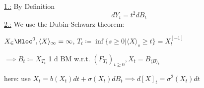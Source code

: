 \underline{1.:}
By Definition
\[dY_t = t^2 dB_t\]
\underline{2.:}
We use the Dubin-Schwarz theorem:

$X_\in\Mloc^0,\langle X\rangle_\infty=\infty$, $T_t\coloneqq \inf\{s\geq 0|\langle X\rangle_s\geq t\}=X_t^{[-1]}$

$\implies B_t\coloneqq X_{T_t}$ 1 d BM w.r.t. $(F_{T_t})_{t\geq 0}, X_t=B_{\langle B\rangle_t}$

here: use $X_t=b(X_t)dt+\sigma(X_t)dB_t\implies d[X]_t=\sigma^2(X_t)dt$



